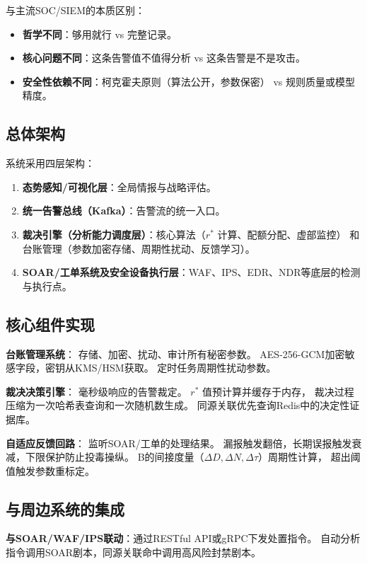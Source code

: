 \documentclass[11pt,a4paper]{article}
\begin{document}
与主流SOC/SIEM的本质区别：
\begin{itemize}
    \item \textbf{哲学不同}：够用就行 vs 完整记录。
    \item \textbf{核心问题不同}：这条告警值不值得分析 vs 这条告警是不是攻击。
    \item \textbf{安全性依赖不同}：柯克霍夫原则（算法公开，参数保密） vs 规则质量或模型精度。
\end{itemize}

\subsection{总体架构}

系统采用四层架构：
\begin{enumerate}
    \item \textbf{态势感知/可视化层}：全局情报与战略评估。
    \item \textbf{统一告警总线（Kafka）}：告警流的统一入口。
    \item \textbf{裁决引擎（分析能力调度层）}：核心算法（$r^*$ 计算、配额分配、虚部监控）
          和台账管理（参数加密存储、周期性扰动、反馈学习）。
    \item \textbf{SOAR/工单系统及安全设备执行层}：WAF、IPS、EDR、NDR等底层的检测与执行点。
\end{enumerate}

\subsection{核心组件实现}

\textbf{台账管理系统}：
存储、加密、扰动、审计所有秘密参数。
AES-256-GCM加密敏感字段，密钥从KMS/HSM获取。
定时任务周期性扰动参数。

\textbf{裁决决策引擎}：
毫秒级响应的告警裁定。
$r^*$ 值预计算并缓存于内存，
裁决过程压缩为一次哈希表查询和一次随机数生成。
同源关联优先查询Redis中的决定性证据库。

\textbf{自适应反馈回路}：
监听SOAR/工单的处理结果。
漏报触发翻倍，长期误报触发衰减，下限保护防止投毒操纵。
B的间接度量（$\Delta D, \Delta N, \Delta \tau$）周期性计算，
超出阈值触发参数重标定。

\subsection{与周边系统的集成}

\textbf{与SOAR/WAF/IPS联动}：通过RESTful API或gRPC下发处置指令。
自动分析指令调用SOAR剧本，同源关联命中调用高风险封禁剧本。
\end{document}

